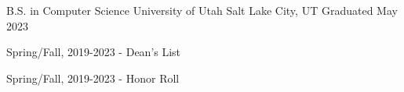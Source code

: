 


\begin{cventries}


\cventry
{B.S. in Computer Science} %
{University of Utah} %
{Salt Lake City, UT} %
{Graduated May 2023} %
{ %
\begin{cvitems}
\item {Spring/Fall, 2019-2023 - Dean's List}
\item {Spring/Fall, 2019-2023 - Honor Roll}
\end{cvitems}
}


\end{cventries}